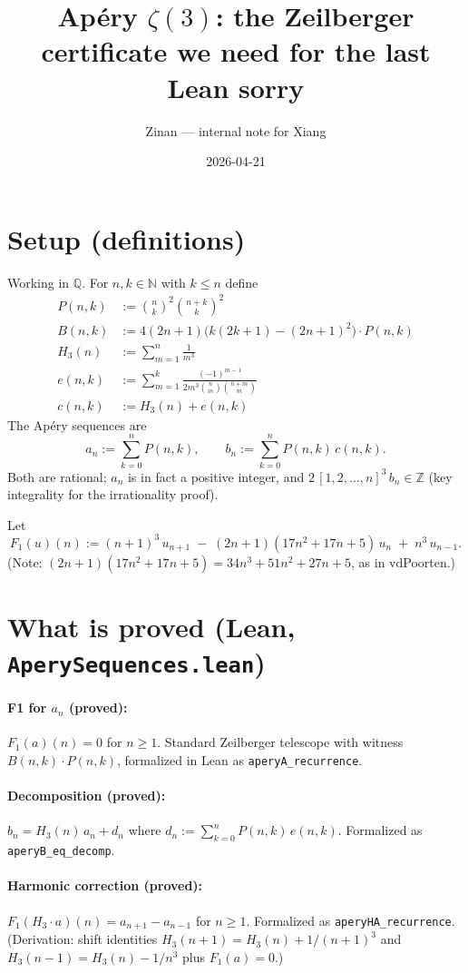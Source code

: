 \documentclass[11pt]{article}
\title{Ap\'ery $\zeta(3)$: the Zeilberger certificate we need for the last Lean sorry}
\author{Zinan --- internal note for Xiang}
\date{2026-04-21}
\newcommand{\N}{\mathbb{N}}
\newcommand{\Q}{\mathbb{Q}}
\newcommand{\Z}{\mathbb{Z}}
\begin{document}
\maketitle

\section{Setup (definitions)}

Working in $\Q$. For $n, k \in \N$ with $k \leq n$ define
\begin{align*}
P(n,k) &:= \binom{n}{k}^2 \binom{n+k}{k}^2 \\
B(n,k) &:= 4(2n+1)\bigl(k(2k+1) - (2n+1)^2\bigr) \cdot P(n,k) \\
H_3(n) &:= \sum_{m=1}^{n} \frac{1}{m^3} \\
e(n,k) &:= \sum_{m=1}^{k} \frac{(-1)^{m-1}}{2 m^3 \binom{n}{m}\binom{n+m}{m}} \\
c(n,k) &:= H_3(n) + e(n,k)
\end{align*}
The Ap\'ery sequences are
\[
a_n := \sum_{k=0}^{n} P(n,k), \qquad b_n := \sum_{k=0}^{n} P(n,k) \, c(n,k).
\]
Both are rational; $a_n$ is in fact a positive integer, and $2\,[1,2,\ldots,n]^3\, b_n \in \Z$ (key integrality for the irrationality proof).

Let
\[
F_1(u)(n) := (n+1)^3 \, u_{n+1} \;-\; (2n+1)(17n^2+17n+5)\, u_n \;+\; n^3 \, u_{n-1}.
\]
(Note: $(2n+1)(17n^2+17n+5) = 34n^3+51n^2+27n+5$, as in vdPoorten.)

\section{What is proved (Lean, \texttt{AperySequences.lean})}

\paragraph{F1 for $a_n$ (proved):}
$F_1(a)(n) = 0$ for $n \geq 1$. Standard Zeilberger telescope with witness $B(n,k) \cdot P(n,k)$, formalized in Lean as \texttt{aperyA\_recurrence}.

\paragraph{Decomposition (proved):}
$b_n = H_3(n) \, a_n + d_n$ where $d_n := \sum_{k=0}^{n} P(n,k) \, e(n,k)$. Formalized as \texttt{aperyB\_eq\_decomp}.

\paragraph{Harmonic correction (proved):}
$F_1(H_3 \cdot a)(n) = a_{n+1} - a_{n-1}$ for $n \geq 1$. Formalized as \texttt{aperyHA\_recurrence}. (Derivation: shift identities $H_3(n+1) = H_3(n) + 1/(n+1)^3$ and $H_3(n-1) = H_3(n) - 1/n^3$ plus $F_1(a) = 0$.)
\end{document}
